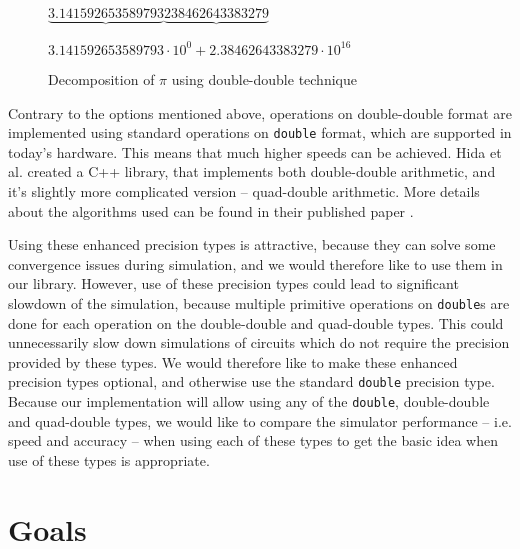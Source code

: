 \begin{figure}[h]
	\centering	
$\underbrace{3.141592653589793}_{ }\underbrace{238462643383279}$ 

$3.141592653589793 \cdot 10^{0} + 2.38462643383279 \cdot 10^{16}$

	\caption{Decomposition of $\pi{}$ using double-double technique}
	\label{fig:dd_pi}
\end{figure}

Contrary to the options mentioned above, operations on double-double format are implemented using standard operations on \texttt{double} format, which are supported in today's hardware. This means that much higher speeds can be achieved. Hida et al. created a C++ library, that implements both double-double arithmetic, and it's slightly more complicated version -- quad-double arithmetic. More details about the algorithms used can be found in their published paper \cite{Hida2007}. 

Using these enhanced precision types is attractive, because they can solve some convergence issues during simulation, and we would therefore like to use them in our library. However, use of these precision types could lead to significant slowdown of the simulation, because multiple primitive operations on \texttt{double}s are done for each operation on the double-double and quad-double types. This could unnecessarily slow down simulations of circuits which do not require the precision provided by these types. We would therefore like to make these enhanced precision types optional, and otherwise use the standard \texttt{double} precision type. Because our implementation will allow using any of the \texttt{double}, double-double and quad-double types, we would like to compare the simulator performance -- i.e. speed and accuracy -- when using each of these types to get the basic idea when use of these types is appropriate.

\section{Goals}
\label{chap:intro:goals}

